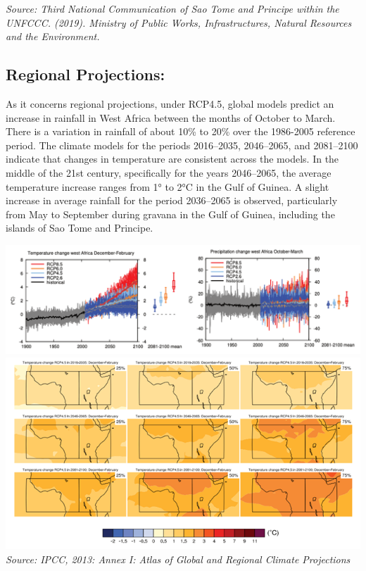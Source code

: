 \documentclass[
]{book}
\begin{document}
\emph{Source: Third National Communication of Sao Tome and Principe within the UNFCCC. (2019). Ministry of Public Works, Infrastructures, Natural Resources and the Environment.}

\hypertarget{regional-projections}{%
\subsection{Regional Projections:}\label{regional-projections}}

As it concerns regional projections, under RCP4.5, global models predict an increase in rainfall in West Africa between the months of October to March. There is a variation in rainfall of about 10\% to 20\% over the 1986-2005 reference period. The climate models for the periods 2016--2035, 2046--2065, and 2081--2100 indicate that changes in temperature are consistent across the models. In the middle of the 21st century, specifically for the years 2046--2065, the average temperature increase ranges from 1° to 2°C in the Gulf of Guinea. A slight increase in average rainfall for the period 2036--2065 is observed, particularly from May to September during gravana in the Gulf of Guinea, including the islands of Sao Tome and Principe.

\includegraphics{images/pr_temp_proj.png}
\includegraphics{images/proj_atlas.png}
\emph{Source: IPCC, 2013: Annex I: Atlas of Global and Regional Climate Projections}
\end{document}
